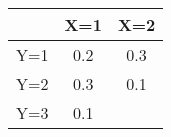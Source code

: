 \begin{tabular}[12pt]{|c|c|c}
\hline

 & X=1 & X=2 \\ \hline
Y=1 & 0.2 & 0.3 \\ \hline
Y=2 & 0.3 & 0.1 \\  \hline
Y=3 & 0.1 & \\
\end{tabular}
